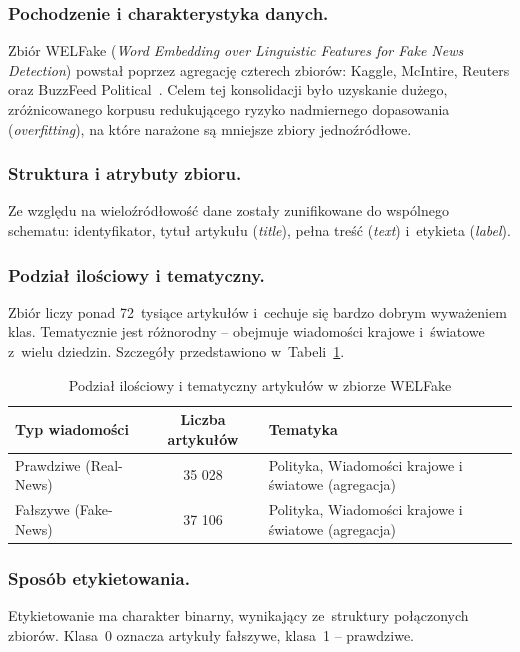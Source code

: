 \documentclass[oneside,polski,logo]{amuthesis}
\begin{document}
\subsubsection{Pochodzenie i charakterystyka danych.} 
Zbiór WELFake (\textit{Word Embedding over Linguistic Features for Fake News Detection}) powstał poprzez agregację czterech zbiorów: Kaggle, McIntire, Reuters oraz BuzzFeed Political~\cite{verma2021welfake}. Celem tej konsolidacji było uzyskanie dużego, zróżnicowanego korpusu redukującego ryzyko nadmiernego dopasowania (\textit{overfitting}), na które narażone są mniejsze zbiory jednoźródłowe.

\subsubsection{Struktura i atrybuty zbioru.} 
Ze względu na wieloźródłowość dane zostały zunifikowane do wspólnego schematu: identyfikator, tytuł artykułu (\textit{title}), pełna treść (\textit{text}) i~etykieta (\textit{label}).

\subsubsection{Podział ilościowy i tematyczny.} 
Zbiór liczy ponad 72~tysiące artykułów i~cechuje się bardzo dobrym wyważeniem klas. Tematycznie jest różnorodny -- obejmuje wiadomości krajowe i~światowe z~wielu dziedzin. Szczegóły przedstawiono w~Tabeli~\ref{tab:welfake_stat}.

\begin{table}[htbp]
\centering
\caption{Podział ilościowy i tematyczny artykułów w zbiorze WELFake}
\vspace{0.2cm}
\begin{tabularx}{\textwidth}{l c X}
\toprule
\textbf{Typ wiadomości} & \textbf{Liczba artykułów} & \textbf{Tematyka} \\
\midrule
Prawdziwe (Real-News) & 35 028 & Polityka, Wiadomości krajowe i światowe (agregacja) \\
Fałszywe (Fake-News) & 37 106 & Polityka, Wiadomości krajowe i światowe (agregacja) \\
\bottomrule
\end{tabularx}
\label{tab:welfake_stat}
\end{table}

\subsubsection{Sposób etykietowania.} 
Etykietowanie ma charakter binarny, wynikający ze~struktury połączonych zbiorów. Klasa~0 oznacza artykuły fałszywe, klasa~1 -- prawdziwe.
\end{document}
